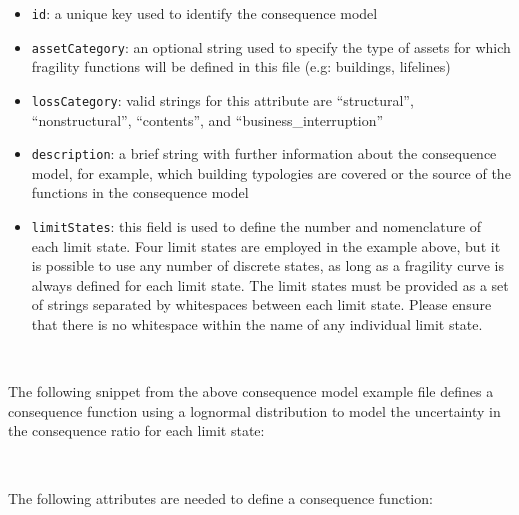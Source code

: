 \begin{itemize}

    \item \Verb+id+: a unique key used to identify the \gls{consequence model}

    \item \Verb+assetCategory+: an optional string used to specify the type of
    \glspl{asset} for which fragility functions will be defined in this file 
    (e.g: buildings, lifelines)

    \item \Verb+lossCategory+: valid strings for this attribute are 
    ``structural'', ``nonstructural'', ``contents'', and 
    ``business\_interruption''

    \item \Verb+description+: a brief string with further information about the
    \gls{consequence model}, for example, which building typologies are covered or 
    the source of the functions in the \gls{consequence model}

    \item \Verb+limitStates+: this field is used to define the number and 
    nomenclature of each limit state. Four limit states are employed in the 
    example above, but it is possible to use any number of discrete states,
    as long as a fragility curve is always defined for each limit state. The 
    limit states must be provided as a set of strings separated by whitespaces 
    between each limit state. Please ensure that there is no whitespace within 
    the name of any individual limit state.

\end{itemize}

\inputminted[firstline=4,firstnumber=4,lastline=9,fontsize=\footnotesize,frame=single,linenos,bgcolor=lightgray]{xml}{oqum/risk/Verbatim/input_consequence.xml}\\

The following snippet from the above consequence model example file defines a
consequence function using a lognormal distribution to model the uncertainty
in the consequence ratio for each limit state:

\inputminted[firstline=11,firstnumber=11,lastline=16,fontsize=\footnotesize,frame=single,linenos,bgcolor=lightgray]{xml}{oqum/risk/Verbatim/input_consequence.xml}\\

The following attributes are needed to define a consequence function:

